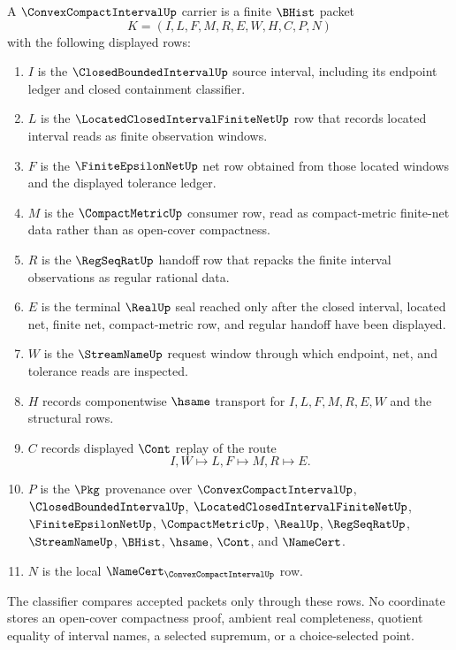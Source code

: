 \begin{definition}
\label{def:convex-compact-interval-carrier}
A $\ConvexCompactIntervalUp$ carrier is a finite $\BHist$ packet
$$
K=(I,L,F,M,R,E,W,H,C,P,N)
$$
with the following displayed rows:
\begin{enumerate}
\item $I$ is the $\ClosedBoundedIntervalUp$ source interval, including its endpoint ledger and closed containment classifier.
\item $L$ is the $\LocatedClosedIntervalFiniteNetUp$ row that records located interval reads as finite observation windows.
\item $F$ is the $\FiniteEpsilonNetUp$ net row obtained from those located windows and the displayed tolerance ledger.
\item $M$ is the $\CompactMetricUp$ consumer row, read as compact-metric finite-net data rather than as open-cover compactness.
\item $R$ is the $\RegSeqRatUp$ handoff row that repacks the finite interval observations as regular rational data.
\item $E$ is the terminal $\RealUp$ seal reached only after the closed interval, located net, finite net, compact-metric row, and regular handoff have been displayed.
\item $W$ is the $\StreamNameUp$ request window through which endpoint, net, and tolerance reads are inspected.
\item $H$ records componentwise $\hsame$ transport for $I,L,F,M,R,E,W$ and the structural rows.
\item $C$ records displayed $\Cont$ replay of the route
$$
I,W \longmapsto L,F \longmapsto M,R \longmapsto E .
$$
\item $P$ is the $\Pkg$ provenance over $\ConvexCompactIntervalUp$, $\ClosedBoundedIntervalUp$, $\LocatedClosedIntervalFiniteNetUp$, $\FiniteEpsilonNetUp$, $\CompactMetricUp$, $\RealUp$, $\RegSeqRatUp$, $\StreamNameUp$, $\BHist$, $\hsame$, $\Cont$, and $\NameCert$.
\item $N$ is the local $\NameCert_{\ConvexCompactIntervalUp}$ row.
\end{enumerate}
The classifier compares accepted packets only through these rows. No coordinate stores an open-cover compactness proof, ambient real completeness, quotient equality of interval names, a selected supremum, or a choice-selected point.
\end{definition}

